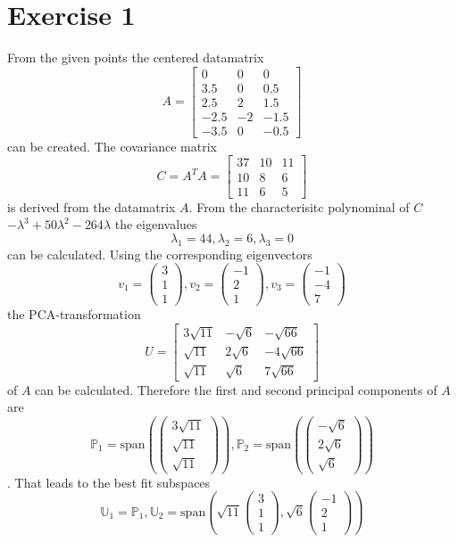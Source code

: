 \section*{Exercise 1}
From the given points the centered datamatrix \[A = \left[\begin{matrix}
0&0&0\\3.5&0&0.5\\2.5&2&1.5\\-2.5&-2&-1.5\\-3.5&0&-0.5
\end{matrix}\right]\] can be created.
The covariance matrix \[C=A^TA = \left[\begin{matrix}
37&10&11\\10&8&6\\11&6&5
\end{matrix}\right]\] is derived from the datamatrix $A$.
From the characterisitc polynominal of $C$ $-\lambda^3+50\lambda^2-264\lambda$ the eigenvalues \[\lambda_1 = 44, \lambda_2 = 6, \lambda_3 = 0\] can be calculated.
Using the corresponding eigenvectors \[v_1 = \left(\begin{matrix}
3\\1\\1
\end{matrix}\right),v_2=\left(\begin{matrix}
-1\\2\\1
\end{matrix}\right), v_3 = \left(\begin{matrix}
-1\\-4\\7
\end{matrix}\right)\]
the PCA-transformation \[U= \left[\begin{matrix}3 \sqrt{11} & -\sqrt{6} & -\sqrt{66}\\\sqrt{11}&2\sqrt{6}&-4\sqrt{66} \\ \sqrt{11} & \sqrt{6} & 7\sqrt{66} \end{matrix}\right]\] of $A$ can be calculated.
Therefore the first and second principal components of $A$ are 
\[\mathbb{P}_1 = \text{span}\left(\left(\begin{matrix}
3\sqrt{11}\\\sqrt{11}\\\sqrt{11}
\end{matrix}\right)\right),\mathbb{P}_2= \text{span}\left(\left(\begin{matrix}
-\sqrt{6}\\2\sqrt{6}\\\sqrt{6}
\end{matrix}\right)\right)\].
That leads to the best fit subspaces \[\mathbb{U}_1 = \mathbb{P}_1, \mathbb{U}_2 = \text{span}\left(\sqrt{11}\left(\begin{matrix}
3\\1\\1
\end{matrix}\right),\sqrt{6}\left(\begin{matrix}
-1\\2\\1
\end{matrix}\right)\right)\]